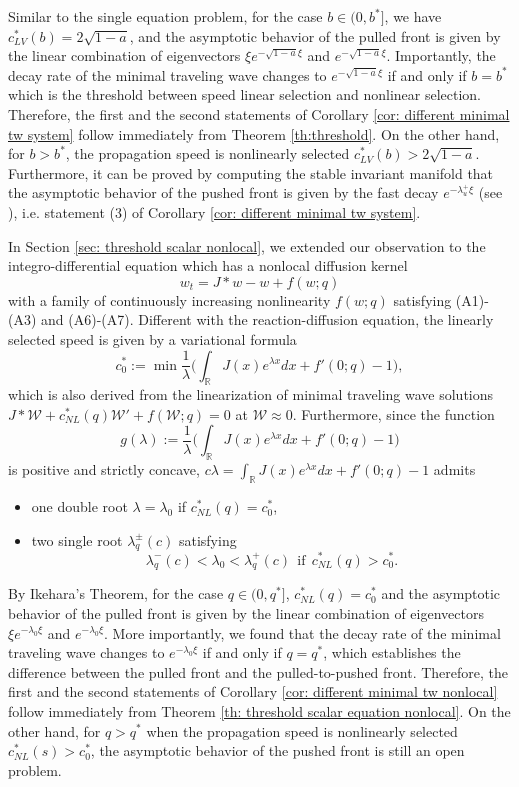 \documentclass[11pt,a4paper]{article}
\numberwithin{equation}{section}
\numberwithin{figure}{section}
\begin{document}
Similar to the single equation problem, for the case $b\in (0,b^*]$, we have $c^*_{LV}(b)=2\sqrt{1-a}$, and the asymptotic behavior of the pulled front is given by the linear combination of eigenvectors $\xi e^{-\sqrt{1-a}\xi}$ and  $e^{-\sqrt{1-a}\xi}$. Importantly,  the decay rate of the minimal traveling wave changes to $e^{-\sqrt{1-a}\xi}$ if and only if $b=b^*$ which is the threshold between speed linear selection and nonlinear selection. Therefore, the first and the second statements of Corollary \ref{cor: different minimal tw system} follow immediately from Theorem \ref{th:threshold}. On the other hand, for $b>b^*$, the propagation speed is nonlinearly selected $c_{LV}^*(b)>2\sqrt{1-a}$. Furthermore, it can be proved by computing the stable invariant manifold that the asymptotic behavior of the pushed front is given by the fast decay $e^{-\lambda_u^+\xi}$ (see \cite{Kan-on1997}), i.e. statement (3) of Corollary \ref{cor: different minimal tw system}.

In Section \ref{sec: threshold scalar nonlocal}, we extended our observation to the integro-differential equation which has a nonlocal diffusion kernel
$$w_t=J\ast w-w+f(w;q)$$
with a family of continuously increasing nonlinearity $f(w;q)$ satisfying (A1)-(A3) and (A6)-(A7). Different with the reaction-diffusion equation, the linearly selected speed is given by a variational formula
$$c_0^*:=\min\frac{1}{\lambda}\Big(\int_{\mathbb{R}}J(x)e^{\lambda x}dx+f'(0;q)-1\Big),$$
which is also derived from the linearization of minimal traveling wave solutions
$J\ast \mathcal{W}+c_{NL}^*(q)\mathcal{W}'+f(\mathcal{W};q)=0$ at $\mathcal{W}\approx 0$. Furthermore, since the function 
$$g(\lambda):=\frac{1}{\lambda}\Big(\int_{\mathbb{R}}J(x)e^{\lambda x}dx+f'(0;q)-1\Big)$$
is positive and strictly concave, 
$c\lambda=\int_{\mathbb{R}}J(x)e^{\lambda x}dx+f'(0;q)-1$ admits
\begin{itemize}
\item one double root $\lambda=\lambda_0$ if $c^*_{NL}( q)=c_0^*$, 
\item two single root $\lambda^{\pm}_q(c)$ satisfying
\begin{equation}\label{two roots}
\lambda^-_q(c)<\lambda_0<\lambda^+_q(c)\ \ \text{if}\ \ c^*_{NL}(q)>c_0^*.
\end{equation}
\end{itemize}

By Ikehara's Theorem, for the case $q\in (0,q^*]$, $c^*_{NL}(q)=c_0^*$ and the asymptotic behavior of the pulled front is given by the linear combination of eigenvectors $\xi e^{-\lambda_0\xi}$ and  $e^{-\lambda_0\xi}$. More importantly, we found that the decay rate of the minimal traveling wave changes to $e^{-\lambda_0\xi}$ if and only if $q=q^*$, which establishes the difference between the pulled front and the pulled-to-pushed front. Therefore, the first and the second statements of Corollary \ref{cor: different minimal tw nonlocal} follow immediately from Theorem \ref{th: threshold scalar equation nonlocal}. On the other hand, for $q>q^*$ when the propagation speed is nonlinearly selected $c_{NL}^*(s)>c_0^*$,  the asymptotic behavior of the pushed front is still an open problem. 
\end{document}
